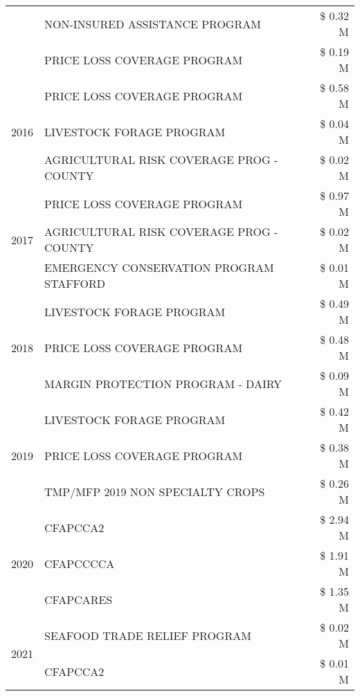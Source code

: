 \begin{tabular}{llr}
 & NON-INSURED ASSISTANCE PROGRAM & \$ 0.32 M \\
 & PRICE LOSS COVERAGE PROGRAM & \$ 0.19 M \\
\cline{1-3}
\multirow[t]{3}{*}{2016} & PRICE LOSS COVERAGE PROGRAM & \$ 0.58 M \\
 & LIVESTOCK FORAGE PROGRAM & \$ 0.04 M \\
 & AGRICULTURAL RISK COVERAGE PROG - COUNTY & \$ 0.02 M \\
\cline{1-3}
\multirow[t]{3}{*}{2017} & PRICE LOSS COVERAGE PROGRAM & \$ 0.97 M \\
 & AGRICULTURAL RISK COVERAGE PROG - COUNTY & \$ 0.02 M \\
 & EMERGENCY CONSERVATION PROGRAM STAFFORD & \$ 0.01 M \\
\cline{1-3}
\multirow[t]{3}{*}{2018} & LIVESTOCK FORAGE PROGRAM & \$ 0.49 M \\
 & PRICE LOSS COVERAGE PROGRAM & \$ 0.48 M \\
 & MARGIN PROTECTION PROGRAM - DAIRY & \$ 0.09 M \\
\cline{1-3}
\multirow[t]{3}{*}{2019} & LIVESTOCK FORAGE PROGRAM & \$ 0.42 M \\
 & PRICE LOSS COVERAGE PROGRAM & \$ 0.38 M \\
 & TMP/MFP 2019 NON SPECIALTY CROPS & \$ 0.26 M \\
\cline{1-3}
\multirow[t]{3}{*}{2020} & CFAPCCA2 & \$ 2.94 M \\
 & CFAPCCCCA & \$ 1.91 M \\
 & CFAPCARES & \$ 1.35 M \\
\cline{1-3}
\multirow[t]{2}{*}{2021} & SEAFOOD TRADE RELIEF PROGRAM & \$ 0.02 M \\
 & CFAPCCA2 & \$ 0.01 M \\
\cline{1-3}
\bottomrule
\end{tabular}
